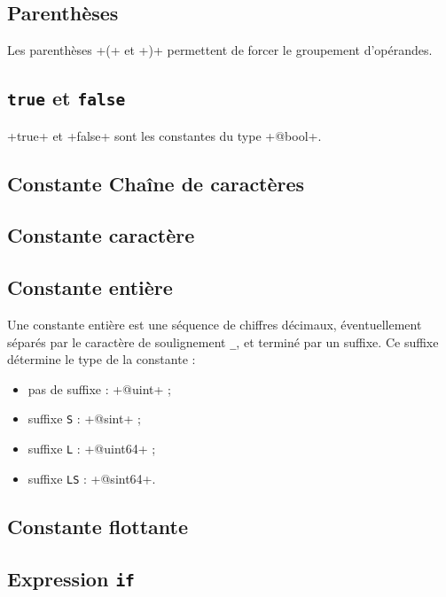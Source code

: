 \subsection{Parenthèses}

Les parenthèses \ggs+(+ et \ggs+)+ permettent de forcer le groupement d'opérandes.






\subsection{\texttt{true} et \texttt{false}}

\ggs+true+ et \ggs+false+ sont les constantes du type \ggs+@bool+.

\subsection{Constante Chaîne de caractères}

\subsection{Constante caractère}

\subsection{Constante entière}

Une constante entière est une séquence de chiffres décimaux, éventuellement séparés par le caractère de soulignement \texttt{\_}, et terminé par un suffixe. Ce suffixe détermine le type de la constante :
\begin{itemize}
  \item pas de suffixe : \ggs+@uint+ ;
  \item suffixe \texttt{S} : \ggs+@sint+ ;
  \item suffixe \texttt{L} : \ggs+@uint64+ ;
  \item suffixe \texttt{LS} : \ggs+@sint64+.
\end{itemize}

\subsection{Constante flottante}

\subsection{Expression \texttt{if}}

